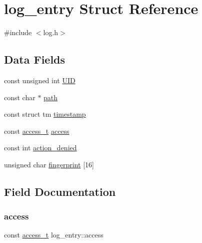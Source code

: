 \hypertarget{structlog__entry}{}\section{log\+\_\+entry Struct Reference}
\label{structlog__entry}


{\ttfamily \#include $<$log.\+h$>$}

\subsection*{Data Fields}
\begin{DoxyCompactItemize}
\item 
const unsigned int \hyperlink{structlog__entry_a879f3cffed87111c14b5ddca7bf36bfe_a879f3cffed87111c14b5ddca7bf36bfe}{U\+ID}
\item 
const char $\ast$ \hyperlink{structlog__entry_af95c41539cb49570c94f3cdbce83440b_af95c41539cb49570c94f3cdbce83440b}{path}
\item 
const struct tm \hyperlink{structlog__entry_a50022de0184c303275407ebd7eb65c63_a50022de0184c303275407ebd7eb65c63}{timestamp}
\item 
const \hyperlink{log_8h_ab20c54dfb1eb1323b9a3cfe2e6a76270_ab20c54dfb1eb1323b9a3cfe2e6a76270}{access\+\_\+t} \hyperlink{structlog__entry_a36a8d704c97e0fa5f3f83454e2d92662_a36a8d704c97e0fa5f3f83454e2d92662}{access}
\item 
const int \hyperlink{structlog__entry_a7845b16ee2d60f04349b65d55c44dd50_a7845b16ee2d60f04349b65d55c44dd50}{action\+\_\+denied}
\item 
unsigned char \hyperlink{structlog__entry_a5e3b10ab8a78db5d73c94a4970da58dd_a5e3b10ab8a78db5d73c94a4970da58dd}{fingerprint} \mbox{[}16\mbox{]}
\end{DoxyCompactItemize}


\subsection{Field Documentation}
\mbox{\label{structlog__entry_a36a8d704c97e0fa5f3f83454e2d92662_a36a8d704c97e0fa5f3f83454e2d92662}} 
\subsubsection{\texorpdfstring{access}{access}}
{\footnotesize\ttfamily const \hyperlink{log_8h_ab20c54dfb1eb1323b9a3cfe2e6a76270_ab20c54dfb1eb1323b9a3cfe2e6a76270}{access\+\_\+t} log\+\_\+entry\+::access}

